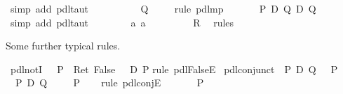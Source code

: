 \begin{isabellebody}
\ {\isacharparenleft}simp\ add{\isacharcolon}\ pdl{\isacharunderscore}taut{\isacharparenright}\isanewline
\ \ \isamarkupfalse%
\isanewline
\ \ \isamarkupfalse%
\isanewline
\ \ \isamarkupfalse%
\ {\isachardoublequote}{\isasymturnstile}\ Q{\isachardoublequote}\ \isanewline
\ \ \isamarkupfalse%
\ {\isacharparenleft}rule\ pdl{\isacharunderscore}mp{\isacharparenright}\isanewline
\ \ \ \ \isamarkupfalse%
\ {\isachardoublequote}{\isasymturnstile}\ P\ {\isasymand}\isactrlsub D\ Q\ {\isasymlongrightarrow}\isactrlsub D\ Q{\isachardoublequote}\ \isamarkupfalse%
\ {\isacharparenleft}simp\ add{\isacharcolon}\ pdl{\isacharunderscore}taut{\isacharparenright}\isanewline
\ \ \isamarkupfalse%
\isanewline
\ \ \isamarkupfalse%
\ \isamarkupfalse%
\ a{}\ a{}\isanewline
\ \ \isamarkupfalse%
\ \isanewline
\ \ \isamarkupfalse%
\ {\isachardoublequote}{\isasymturnstile}\ R{\isachardoublequote}\ \isamarkupfalse%
\ {\isacharparenleft}rules{\isacharparenright}\isanewline
\isamarkupfalse%
\isamarkupfalse%
%
\begin{isamarkuptext}%
Some further typical rules.%
\end{isamarkuptext}%
\isamarkuptrue%
\ pdl{\isacharunderscore}notI{\isacharcolon}\ {\isachardoublequote}{\isasymlbrakk}\ {\isasymturnstile}\ P{\isacharsemicolon}\ {\isasymturnstile}\ Ret\ False{\isasymrbrakk}\ {\isasymLongrightarrow}\ {\isasymturnstile}\ {\isasymnot}\isactrlsub D\ P{\isachardoublequote}\isanewline
\isamarkupfalse%
rule\ pdl{\isacharunderscore}FalseE{\isacharparenright}\isanewline
\isanewline
\isamarkupfalse%
\ pdl{\isacharunderscore}conjunct{}{\isacharcolon}\ {\isachardoublequote}{\isasymturnstile}\ P\ {\isasymand}\isactrlsub D\ Q\ {\isasymLongrightarrow}\ {\isasymturnstile}\ P{\isachardoublequote}\isanewline
\isamarkupfalse%
\ {\isacharminus}\isanewline
\ \ \isamarkupfalse%
\ {\isachardoublequote}{\isasymturnstile}\ P\ {\isasymand}\isactrlsub D\ Q{\isachardoublequote}\isanewline
\ \ \isamarkupfalse%
\ {\isachardoublequote}{\isasymturnstile}\ P{\isachardoublequote}\isanewline
\ \ \isamarkupfalse%
\ {\isacharparenleft}rule\ pdl{\isacharunderscore}conjE{\isacharparenright}\isanewline
\ \ \ \ \isamarkupfalse%
\ {\isachardoublequote}{\isasymturnstile}\ P{\isachardoublequote}\isanewline

\end{isabellebody}
